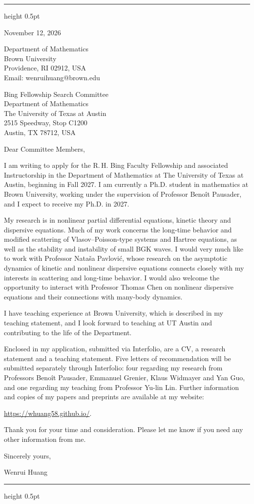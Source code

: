 \documentclass[10pt]{article}
\begin{document}
\vspace{0.08in}
\hrule height 0.5pt

\vspace{0.47in}
\hfill
\begin{minipage}{2.27in}
November 12, 2026

\vspace{0.16in}
Department of Mathematics\\
Brown University\\
Providence, RI 02912, USA\\
Email: wenrui\textunderscore huang@brown.edu
\end{minipage}

\vspace{0.30in}
Bing Fellowship Search Committee\\
Department of Mathematics\\
The University of Texas at Austin\\
2515 Speedway, Stop C1200\\
Austin, TX 78712, USA

\vspace{0.16in}
Dear Committee Members,

I am writing to apply for the R.\,H. Bing Faculty Fellowship and associated Instructorship in the Department of Mathematics at The University of Texas at Austin, beginning in Fall 2027. I am currently a Ph.D. student in mathematics at Brown University, working under the supervision of Professor Beno\^{i}t Pausader, and I expect to receive my Ph.D. in 2027.

My research is in nonlinear partial differential equations, kinetic theory and dispersive equations. Much of my work concerns the long-time behavior and modified scattering of Vlasov--Poisson-type systems and Hartree equations, as well as the stability and instability of small BGK waves. I would very much like to work with Professor Nata\v{s}a Pavlovi\'{c}, whose research on the asymptotic dynamics of kinetic and nonlinear dispersive equations connects closely with my interests in scattering and long-time behavior. I would also welcome the opportunity to interact with Professor Thomas Chen on nonlinear dispersive equations and their connections with many-body dynamics.

I have teaching experience at Brown University, which is described in my teaching statement, and I look forward to teaching at UT Austin and contributing to the life of the Department.

Enclosed in my application, submitted via Interfolio, are a CV, a research statement and a teaching statement. Five letters of recommendation will be submitted separately through Interfolio: four regarding my research from Professors Beno\^{i}t Pausader, Emmanuel Grenier, Klaus Widmayer and Yan Guo, and one regarding my teaching from Professor Yu-lin Lin. Further information and copies of my papers and preprints are available at my website:

\url{https://whuang58.github.io/}.

\medskip
Thank you for your time and consideration. Please let me know if you need any other information from me.

\vspace{0.12in}
Sincerely yours,

\vspace{0.12in}
Wenrui Huang

\vfill
\hrule height 0.5pt
\end{document}
